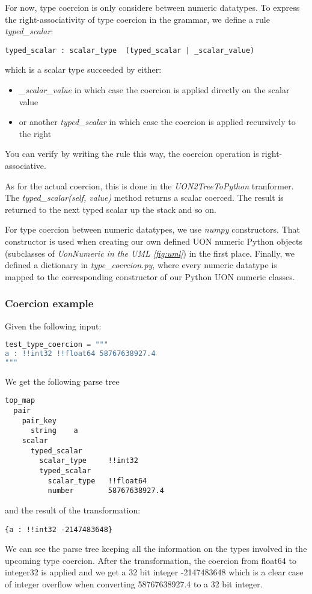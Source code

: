 \documentclass[12pt]{article}
\begin{document}
For now, type coercion is only considere between numeric datatypes. To express the right-associativity of type coercion in the grammar, we define a rule \emph{typed\_scalar}:
\begin{lstlisting}
typed_scalar : scalar_type  (typed_scalar | _scalar_value)
\end{lstlisting}
which is a scalar type succeeded by either:
\begin{itemize}
    \item \emph{\_scalar\_value} in which case the coercion is applied directly on the scalar value
    \item or another \emph{typed\_scalar} in which case the coercion is applied recursively to the right 
\end{itemize}
You can verify by writing the rule this way, the coercion operation is right-associative.

As for the actual coercion, this is done in the \emph{UON2TreeToPython} tranformer. The \emph{typed\_scalar(self, value)} method returns a scalar coerced. The result is returned to the next typed scalar up the stack and so on. 

For type coercion between numeric datatypes, we use \emph{numpy} constructors. That constructor is used when creating our own defined UON numeric Python objects (subclasses of \emph{UonNumeric in the UML \ref{fig:uml}}) in the first place. Finally, we defined a dictionary in \emph{type\_coercion.py}, where every numeric datatype is mapped to the corresponding constructor of our Python UON numeric classes.

\subsubsection{Coercion example}
Given the following input:
\begin{lstlisting}[language=Python]
test_type_coercion = """
a : !!int32 !!float64 58767638927.4
"""
\end{lstlisting}

We get the following parse tree
\begin{lstlisting}
top_map
  pair
    pair_key
      string    a
    scalar
      typed_scalar
        scalar_type     !!int32
        typed_scalar
          scalar_type   !!float64
          number        58767638927.4
\end{lstlisting}

and the result of the transformation:
\begin{lstlisting}
{a : !!int32 -2147483648}
\end{lstlisting}
We can see the parse tree keeping all the information on the types involved in the upcoming type coercion. After the transformation, the coercion from float64 to integer32 is applied and we get a 32 bit integer -2147483648 which is a clear case of integer overflow when converting 58767638927.4 to a 32 bit integer.
\end{document}
